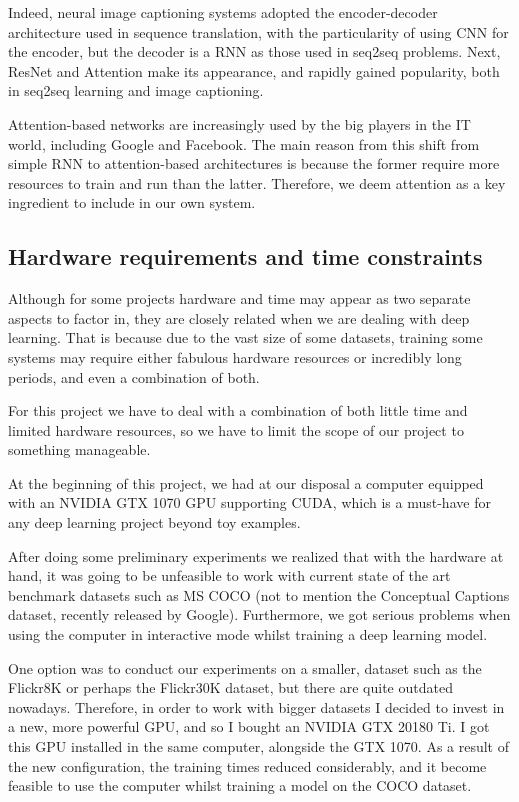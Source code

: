 Indeed, neural image captioning systems adopted the encoder-decoder architecture used in sequence translation, with the particularity of using CNN for the encoder, but the decoder is a RNN as those used in seq2seq problems. Next, ResNet and Attention make its appearance, and rapidly gained popularity, both in seq2seq learning and image captioning.

Attention-based networks are increasingly used by the big players in the IT world, including Google and Facebook. The main reason from this shift from simple RNN to attention-based architectures is because the former require more resources to train and run than the latter. Therefore, we deem attention as a key ingredient to include in our own system.

\subsection{Hardware requirements and time constraints}

Although for some projects hardware and time may appear as two separate aspects to factor in, they are closely related when we are dealing with deep learning. That is because due to the vast size of some datasets, training some systems may require either fabulous hardware resources or incredibly long periods, and even a combination of both.

For this project we have to deal with a combination of both little time and limited hardware resources, so we have to limit the scope of our project to something manageable.

At the beginning of this project, we had at our disposal a computer equipped with an NVIDIA GTX 1070 GPU supporting CUDA, which is a must-have for any deep learning project beyond toy examples.

After doing some preliminary experiments we realized that with the hardware at hand, it was going to be unfeasible to work with current state of the art benchmark datasets such as MS COCO (not to mention the Conceptual Captions dataset, recently released by Google). Furthermore, we got serious problems when using the computer in interactive mode whilst training a deep learning model. 

One option was to conduct our experiments on a smaller, dataset such as the Flickr8K or perhaps the Flickr30K dataset, but there are quite outdated nowadays. Therefore, in order to work with bigger datasets I decided to invest in a new, more powerful GPU, and so I bought an NVIDIA GTX 20180 Ti. I got this GPU installed in the same computer, alongside the GTX 1070. As a result of the new configuration, the training times reduced considerably, and it become feasible to use the computer whilst training a model on the COCO dataset.


